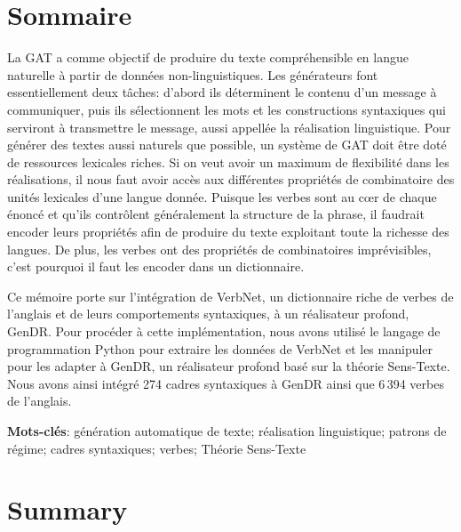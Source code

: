 \chapter*{Sommaire} 	%
La \ac{GAT} a comme objectif de produire du texte compréhensible en langue naturelle à partir de données non-linguistiques. Les générateurs font essentiellement deux tâches: d'abord ils déterminent le contenu d'un message à communiquer, puis ils sélectionnent les mots et les constructions syntaxiques qui serviront à transmettre le message, aussi appellée la réalisation linguistique. Pour générer des textes aussi naturels que possible, un système de \ac{GAT} doit être doté de ressources lexicales riches. Si on veut avoir un maximum de flexibilité dans les réalisations, il nous faut avoir accès aux différentes propriétés de combinatoire des unités lexicales d'une langue donnée. Puisque les verbes sont au c\oe{}r de chaque énoncé et qu'ils contrôlent généralement la structure de la phrase, il faudrait encoder leurs propriétés afin de produire du texte exploitant toute la richesse des langues. De plus, les verbes ont des propriétés de combinatoires imprévisibles, c'est pourquoi il faut les encoder dans un dictionnaire.

Ce mémoire porte sur l'intégration de VerbNet, un dictionnaire riche de verbes de l'anglais et de leurs comportements syntaxiques, à un réalisateur profond, GenDR. Pour procéder à cette implémentation, nous avons utilisé le langage de programmation Python pour extraire les données de VerbNet et les manipuler pour les adapter à GenDR, un réalisateur profond basé sur la théorie Sens-Texte. Nous avons ainsi intégré 274 cadres syntaxiques à GenDR ainsi que 6\,394 verbes de l'anglais.

\textbf{Mots-clés}: génération automatique de texte; réalisation linguistique; patrons de régime; cadres syntaxiques; verbes; Théorie Sens-Texte

\chapter*{Summary}

